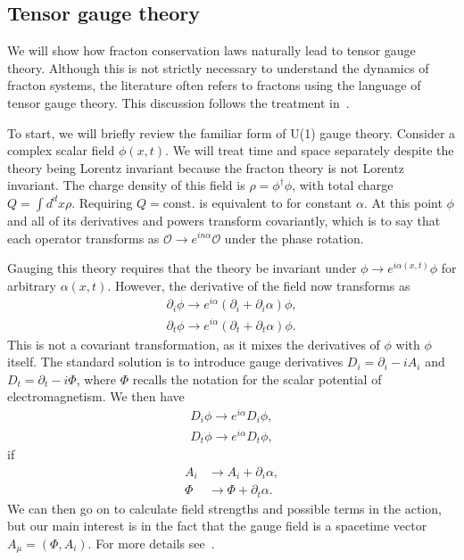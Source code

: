 \documentclass[a4paper,11pt]{article}
\newcommand{\nn}{\nonumber\\}
\newcommand{\note}[1]{{\color{red}{#1}}}
\begin{document}
\subsection{Tensor gauge theory} \label{sub:tensor}

\note{Is this section necessary, or even useful?}

We will show how fracton conservation laws naturally lead to tensor gauge theory. Although this is not strictly necessary to understand the dynamics of fracton systems, the literature often refers to fractons using the language of tensor gauge theory. This discussion follows the treatment in~\cite{PretkoFractonGauge}. 

To start, we will briefly review the familiar form of U(1) gauge theory. Consider a complex scalar field $\phi(x,t)$. We will treat time and space separately despite the theory being Lorentz invariant because the fracton theory is not Lorentz invariant. The charge density of this field is $\rho =\phi^\dag\phi$, with total charge $Q=\int d^dx \rho$. Requiring $Q=\text{const.}$ is equivalent to \note{requiring
\begin{align}
\phi\to e^{i\alpha}\phi
\end{align}	
be a symmetry of the theory,} for constant $\alpha$. At this point $\phi$ and all of its derivatives and powers transform covariantly, which is to say that each operator transforms as $\mathcal{O}\to e^{in\alpha}\mathcal{O}$ under the phase rotation.

Gauging this theory requires that the theory be invariant under $\phi\to e^{i\alpha(x,t)}\phi$ for arbitrary $\alpha(x,t)$. However, the derivative of the field now transforms as 
\begin{align}
\partial_i\phi\to e^{i\alpha}\left(\partial_i+\partial_i\alpha\right)\phi,\nn
\partial_t\phi\to e^{i\alpha}\left(\partial_t+\partial_t\alpha\right)\phi.
	\label{eqn:nconv}
\end{align}
This is not a covariant transformation, as it mixes the derivatives of $\phi$ with $\phi$ itself. The standard solution is to introduce gauge derivatives $D_i=\partial_i-iA_i$ and $D_t=\partial_t-i\Phi$, where $\Phi$ recalls the notation for the scalar potential of electromagnetism. We then have 
\begin{align}
D_i\phi\to e^{i\alpha}D_i\phi,\nn
D_t\phi\to e^{i\alpha}D_t\phi,
\end{align}
if 
\begin{align}
A_i &\to A_i+\partial_i\alpha, \nn
\Phi&\to\Phi+\partial_t\alpha.
\end{align}
We can then go on to calculate field strengths and possible terms in the action, but our main interest is in the fact that the gauge field is a spacetime vector $A_\mu=(\Phi,A_i)$. For more details see~\cite{PretkoFractonGauge}.
\end{document}
